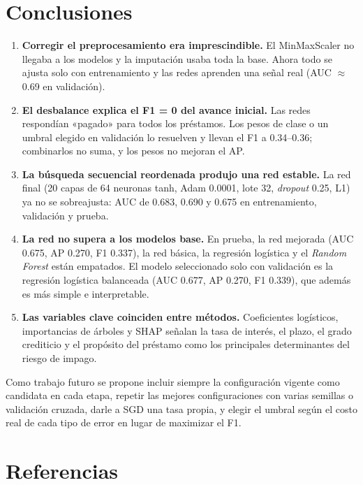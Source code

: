 \documentclass[12pt,a4paper]{article}
\begin{document}
\section{Conclusiones}\label{sec:conclusiones}

\begin{enumerate}
\item \textbf{Corregir el preprocesamiento era imprescindible.} El MinMaxScaler no llegaba a los modelos y la imputación usaba toda la base. Ahora todo se ajusta solo con entrenamiento y las redes aprenden una señal real (AUC $\approx$ 0.69 en validación).
\item \textbf{El desbalance explica el F1 = 0 del avance inicial.} Las redes respondían «pagado» para todos los préstamos. Los pesos de clase o un umbral elegido en validación lo resuelven y llevan el F1 a 0.34--0.36; combinarlos no suma, y los pesos no mejoran el AP.
\item \textbf{La búsqueda secuencial reordenada produjo una red estable.} La red final (20 capas de 64 neuronas tanh, Adam 0.0001, lote 32, \textit{dropout} 0.25, L1) ya no se sobreajusta: AUC de 0.683, 0.690 y 0.675 en entrenamiento, validación y prueba.
\item \textbf{La red no supera a los modelos base.} En prueba, la red mejorada (AUC 0.675, AP 0.270, F1 0.337), la red básica, la regresión logística y el \textit{Random Forest} están empatados. El modelo seleccionado solo con validación es la regresión logística balanceada (AUC 0.677, AP 0.270, F1 0.339), que además es más simple e interpretable.
\item \textbf{Las variables clave coinciden entre métodos.} Coeficientes logísticos, importancias de árboles y SHAP señalan la tasa de interés, el plazo, el grado crediticio y el propósito del préstamo como los principales determinantes del riesgo de impago.
\end{enumerate}

Como trabajo futuro se propone incluir siempre la configuración vigente como candidata en cada etapa, repetir las mejores configuraciones con varias semillas o validación cruzada, darle a SGD una tasa propia, y elegir el umbral según el costo real de cada tipo de error en lugar de maximizar el F1.

\section*{Referencias}
\begingroup
\setlength{\parindent}{-1.25cm}
\setlength{\leftskip}{1.25cm}
\setlength{\parskip}{6pt}
\small
\end{document}
